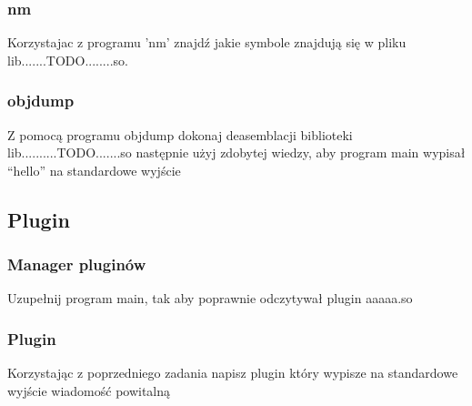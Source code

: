 \documentclass[12pt]{article}
\begin{document}
\subsubsection{nm}
Korzystajac z programu 'nm' znajdź jakie symbole znajdują się w pliku
lib.......TODO........so.
\subsubsection{objdump}
Z pomocą programu objdump dokonaj deasemblacji biblioteki
lib..........TODO.......so następnie użyj zdobytej wiedzy, aby program main
wypisał ``hello'' na standardowe wyjście
\subsection{Plugin}
\subsubsection{Manager pluginów}
Uzupełnij program main, tak aby poprawnie odczytywał plugin aaaaa.so
\subsubsection{Plugin}
Korzystając z poprzedniego zadania napisz plugin który wypisze na standardowe
wyjście wiadomość powitalną
\end{document}
